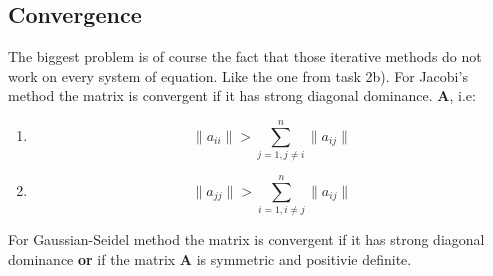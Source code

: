 \documentclass[12pt]{report}
\begin{document}
\newpage
\subsection{Convergence}
The biggest problem is of course the fact that those iterative methods do not work on every system of equation. Like the one from task 2b).
For Jacobi's method the matrix is convergent if it has strong diagonal dominance. \textbf{A}, i.e:
\begin{enumerate}
  \item \[ \| a_{ii} \| > \sum^n_{j=1, j \neq i} \|a_{ij} \| \]
  \item \[ \| a_{jj} \| > \sum^n_{i=1, i \neq j} \|a_{ij} \| \]
\end{enumerate}
For Gaussian-Seidel method the matrix is convergent if it has strong diagonal dominance \textbf{or} if the matrix \textbf{A} is symmetric and positivie definite.
\end{document}
